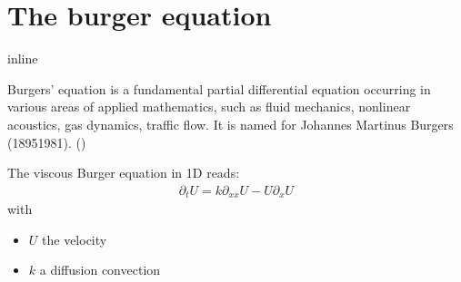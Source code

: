 \documentclass[letterpaper,10pt,english]{sphinxmanual}
\begin{document}
\noindent{}


\section{The burger equation}
\label{\detokenize{cookbook/burger_equation:the-burger-equation}}\label{\detokenize{cookbook/burger_equation::doc}}
\begin{sphinxVerbatim}[commandchars=\\\{\}]
   
   
 

   
   

   

      


 inline
\end{sphinxVerbatim}

Burgers' equation is a fundamental partial differential equation
occurring in various areas of applied mathematics, such as fluid
mechanics, nonlinear acoustics, gas dynamics, traffic flow. It is named
for Johannes Martinus Burgers (1895\textendash{}1981).
()

The viscous Burger equation in 1D reads:
\begin{equation*}
\begin{split}\partial_{t}U = k \partial_{xx} U - U \partial_{x} U\end{split}
\end{equation*}
with
\begin{itemize}
\item {} 
\(U\) the velocity

\item {} 
\(k\) a diffusion convection

\end{itemize}
\end{document}
